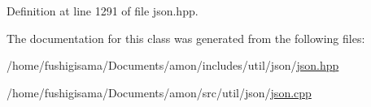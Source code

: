 Definition at line 1291 of file json.\-hpp.



The documentation for this class was generated from the following files\-:\begin{DoxyCompactItemize}
\item 
/home/fushigisama/\-Documents/amon/includes/util/json/\hyperlink{json_8hpp}{json.\-hpp}\item 
/home/fushigisama/\-Documents/amon/src/util/json/\hyperlink{json_8cpp}{json.\-cpp}\end{DoxyCompactItemize}
